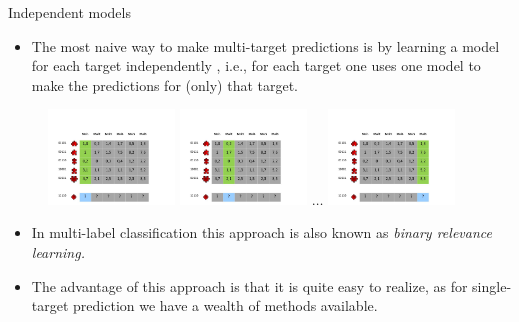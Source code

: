 \begin{frame}{Independent models}
%	
	\begin{itemize}
		\item 	The most naive way to make multi-target predictions is by learning a model for each target independently , i.e., for each target one uses one model to make the predictions for (only) that target.
%	
	\end{itemize}

	\begin{figure}
		\centering
		\includegraphics[width=0.3\textwidth,trim = 0 0 100 100,clip]{figure/Slide13}
		\includegraphics[width=0.3\textwidth,trim = 0 0 100 100,clip]{figure/Slide14} 
%		
		$\ldots$
%		
		\includegraphics[width=0.3\textwidth,trim = 0 0 100 100,clip]{figure/Slide15}
	\end{figure}
%	
%
	\begin{itemize}
%		
		\item In multi-label classification this approach is also known as \emph{binary relevance learning.}
		\item The advantage of this approach is that it is quite easy to realize, as for single-target prediction we have a wealth of methods available.
	\end{itemize}

\end{frame}

